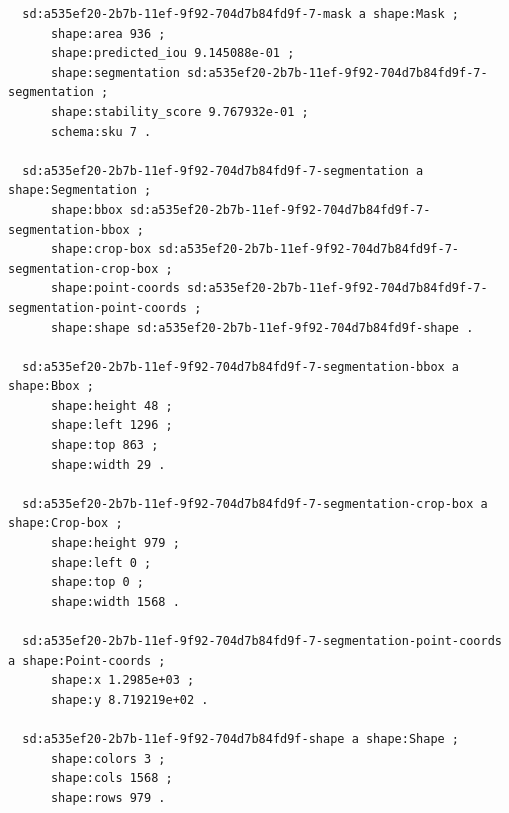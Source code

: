 \documentclass[732,14pt,final]{studrep}
\begin{document}
\begin{verbatim}
  sd:a535ef20-2b7b-11ef-9f92-704d7b84fd9f-7-mask a shape:Mask ;
      shape:area 936 ;
      shape:predicted_iou 9.145088e-01 ;
      shape:segmentation sd:a535ef20-2b7b-11ef-9f92-704d7b84fd9f-7-segmentation ;
      shape:stability_score 9.767932e-01 ;
      schema:sku 7 .
  
  sd:a535ef20-2b7b-11ef-9f92-704d7b84fd9f-7-segmentation a shape:Segmentation ;
      shape:bbox sd:a535ef20-2b7b-11ef-9f92-704d7b84fd9f-7-segmentation-bbox ;
      shape:crop-box sd:a535ef20-2b7b-11ef-9f92-704d7b84fd9f-7-segmentation-crop-box ;
      shape:point-coords sd:a535ef20-2b7b-11ef-9f92-704d7b84fd9f-7-segmentation-point-coords ;
      shape:shape sd:a535ef20-2b7b-11ef-9f92-704d7b84fd9f-shape .
  
  sd:a535ef20-2b7b-11ef-9f92-704d7b84fd9f-7-segmentation-bbox a shape:Bbox ;
      shape:height 48 ;
      shape:left 1296 ;
      shape:top 863 ;
      shape:width 29 .
  
  sd:a535ef20-2b7b-11ef-9f92-704d7b84fd9f-7-segmentation-crop-box a shape:Crop-box ;
      shape:height 979 ;
      shape:left 0 ;
      shape:top 0 ;
      shape:width 1568 .
  
  sd:a535ef20-2b7b-11ef-9f92-704d7b84fd9f-7-segmentation-point-coords a shape:Point-coords ;
      shape:x 1.2985e+03 ;
      shape:y 8.719219e+02 .
  
  sd:a535ef20-2b7b-11ef-9f92-704d7b84fd9f-shape a shape:Shape ;
      shape:colors 3 ;
      shape:cols 1568 ;
      shape:rows 979 . 
\end{verbatim}
\end{document}
